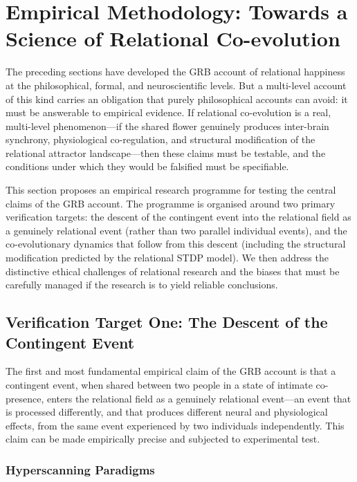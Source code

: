 \section{Empirical Methodology: Towards a Science of Relational Co-evolution}
\label{p14:sec:empirical}

\noindent
The preceding sections have developed the GRB account of relational happiness at the philosophical, formal, and neuroscientific levels. But a multi-level account of this kind carries an obligation that purely philosophical accounts can avoid: it must be answerable to empirical evidence. If relational co-evolution is a real, multi-level phenomenon---if the shared flower genuinely produces inter-brain synchrony, physiological co-regulation, and structural modification of the relational attractor landscape---then these claims must be testable, and the conditions under which they would be falsified must be specifiable.

This section proposes an empirical research programme for testing the central claims of the GRB account. The programme is organised around two primary verification targets: the descent of the contingent event into the relational field as a genuinely relational event (rather than two parallel individual events), and the co-evolutionary dynamics that follow from this descent (including the structural modification predicted by the relational STDP model). We then address the distinctive ethical challenges of relational research and the biases that must be carefully managed if the research is to yield reliable conclusions.

\subsection{Verification Target One: The Descent of the Contingent Event}
\label{p14:subsec:vt1}

\noindent
The first and most fundamental empirical claim of the GRB account is that a contingent event, when shared between two people in a state of intimate co-presence, enters the relational field as a genuinely relational event---an event that is processed differently, and that produces different neural and physiological effects, from the same event experienced by two individuals independently. This claim can be made empirically precise and subjected to experimental test.

\subsubsection{Hyperscanning Paradigms}
\label{p14:subsubsec:hyperscanning2}

